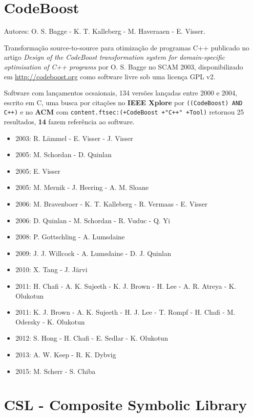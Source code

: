 \section{CodeBoost}

Autores:
O. S. Bagge - K. T. Kalleberg - M. Haveraaen - E. Visser.

Transformação source-to-source para otimização de programas C++
publicado no artigo {\it Design of the CodeBoost transformation system for domain-specific optimisation of C++ programs}
por O. S. Bagge
no SCAM 2003,
disponibilizado em \url{http://codeboost.org}
como software livre
sob uma licença GPL v2.

Software com lançamentos ocsaionais,
134 versões lançadas
entre 2000 e 2004,
escrito em C,
uma busca por citações no {\bf IEEE Xplore} por
\texttt{((CodeBoost) AND C++)}
e no {\bf ACM} com
\texttt{content.ftsec:(+CodeBoost +"C++" +Tool)}
retornou
25 resultados,
{\bf 14} fazem referência ao software.

\begin{itemize}
\item 2003: R. L\"{a}mmel - E. Visser - J. Visser
\item 2005: M. Schordan - D. Quinlan
\item 2005: E. Visser
\item 2005: M. Mernik - J. Heering - A. M. Sloane
\item 2006: M. Bravenboer - K. T. Kalleberg - R. Vermaas - E. Visser
\item 2006: D. Quinlan - M. Schordan - R. Vuduc - Q. Yi
\item 2008: P. Gottschling - A. Lumsdaine
\item 2009: J. J. Willcock - A. Lumsdaine - D. J. Quinlan
\item 2010: X. Tang - J. J\"{a}rvi
\item 2011: H. Chafi - A. K. Sujeeth - K. J. Brown - H. Lee - A. R. Atreya - K. Olukotun
\item 2011: K. J. Brown - A. K. Sujeeth - H. J. Lee - T. Rompf - H. Chafi - M. Odersky - K. Olukotun
\item 2012: S. Hong - H. Chafi - E. Sedlar - K. Olukotun
\item 2013: A. W. Keep - R. K. Dybvig
\item 2015: M. Scherr - S. Chiba
\end{itemize}

\section{CSL - Composite Symbolic Library}

